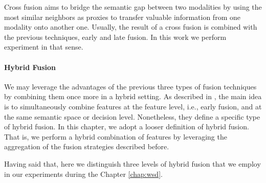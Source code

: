 Cross fusion aims to bridge the semantic gap between two modalities by using the most similar neighbors as proxies to transfer valuable information  from one modality onto another one. Usually, the result of a cross fusion is combined with the previous techniques, early and late fusion. In this work we perform  experiment in that sense.

\paragraph{Hybrid Fusion}
We may leverage the advantages of the previous three types of fusion techniques by combining them once more in a hybrid setting. As described in \cite{AtreyHEK10,yu2014informedia}, the main idea is to simultaneously combine features at the feature level, i.e., early fusion, and at the same semantic space or decision level. Nonetheless, they define a specific type of hybrid fusion. In this chapter, we adopt a looser definition of hybrid fusion. That is, we perform a hybrid combination of features by leveraging the aggregation of the fusion strategies described before. 

Having said that, here we distinguish three levels of hybrid fusion that we employ in our experiments during the Chapter \ref{chap:wsd}. 

